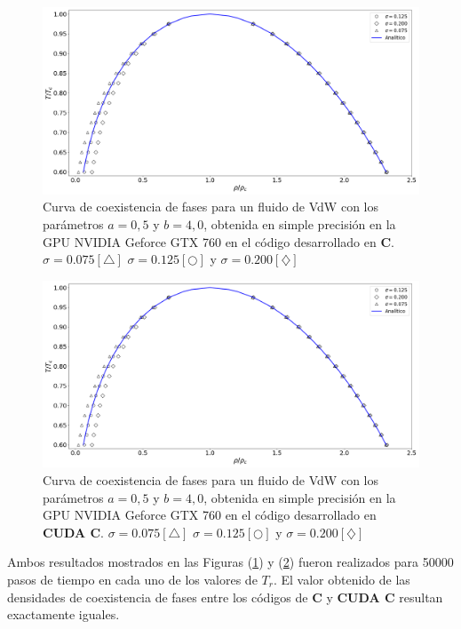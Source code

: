 \begin{figure}[h!]
	\centering
	\includegraphics[width=\textwidth]{figs/cap4/v_760_MxC_c_simple}
	\caption{Curva de coexistencia de fases para un fluido de VdW con los parámetros $a = 0,5 $ y $b = 4,0 $, obtenida en simple precisión en la GPU NVIDIA Geforce GTX 760 en el código desarrollado en \textbf{C}. $\sigma = 0.075[\bigtriangleup]$	 $\sigma = 0.125[\bigcirc]$ y $\sigma = 0.200[\diamondsuit]$ }
 	\label{fig:v_760_MxC_c_simple}	
\end{figure}

\begin{figure}[h!]
	\centering
	\includegraphics[width=\textwidth]{figs/cap4/v_760_MxC_cuda_simple}
	\caption{Curva de coexistencia de fases para un fluido de VdW con los parámetros $a = 0,5 $ y $b = 4,0 $, obtenida en simple precisión en la GPU NVIDIA Geforce GTX 760 en el código desarrollado en \textbf{CUDA C}. $\sigma = 0.075[\bigtriangleup]$	 $\sigma = 0.125[\bigcirc]$ y $\sigma = 0.200[\diamondsuit]$ }
	\label{fig:v_760_MxC_cuda_simple}	
\end{figure}

Ambos resultados mostrados en las Figuras (\ref{fig:v_760_MxC_c_simple}) y (\ref{fig:v_760_MxC_cuda_simple}) fueron realizados para 50000 pasos de tiempo en cada uno de los valores de $T_r$. El valor obtenido de las densidades de coexistencia de fases entre los códigos de \textbf{C} y \textbf{CUDA C} resultan exactamente iguales. 

